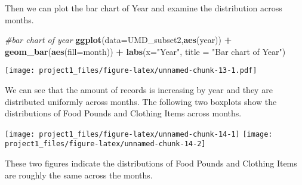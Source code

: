 \documentclass[]{article}
\newenvironment{Shaded}{\begin{snugshade}}{\end{snugshade}}
\newcommand{\CommentTok}[1]{\textcolor[rgb]{0.56,0.35,0.01}{\textit{#1}}}
\newcommand{\DataTypeTok}[1]{\textcolor[rgb]{0.13,0.29,0.53}{#1}}
\newcommand{\DecValTok}[1]{\textcolor[rgb]{0.00,0.00,0.81}{#1}}
\newcommand{\KeywordTok}[1]{\textcolor[rgb]{0.13,0.29,0.53}{\textbf{#1}}}
\newcommand{\NormalTok}[1]{#1}
\newcommand{\OperatorTok}[1]{\textcolor[rgb]{0.81,0.36,0.00}{\textbf{#1}}}
\newcommand{\StringTok}[1]{\textcolor[rgb]{0.31,0.60,0.02}{#1}}
\begin{document}
\begin{Shaded}
\end{Shaded}

Then we can plot the bar chart of Year and examine the distribution
across months.

\begin{Shaded}
\begin{Highlighting}[]
\CommentTok{#bar chart of year}
\KeywordTok{ggplot}\NormalTok{(}\DataTypeTok{data=}\NormalTok{UMD_subset2,}\KeywordTok{aes}\NormalTok{(year)) }\OperatorTok{+}
\StringTok{  }\KeywordTok{geom_bar}\NormalTok{(}\KeywordTok{aes}\NormalTok{(}\DataTypeTok{fill=}\NormalTok{month)) }\OperatorTok{+}
\StringTok{  }\KeywordTok{labs}\NormalTok{(}\DataTypeTok{x=}\StringTok{"Year"}\NormalTok{,}
       \DataTypeTok{title =} \StringTok{"Bar chart of Year"}\NormalTok{)}
\end{Highlighting}
\end{Shaded}

\texttt{[image: project1\_files/figure-latex/unnamed-chunk-13-1.pdf]}

We can see that the amount of records is increasing by year and they are
distributed uniformly across months. The following two boxplots show the
distributions of Food Pounds and Clothing Items across months.

\texttt{[image: project1\_files/figure-latex/unnamed-chunk-14-1]}
\texttt{[image: project1\_files/figure-latex/unnamed-chunk-14-2]}

These two figures indicate the distributions of Food Pounds and Clothing
Items are roughly the same across the months.
\end{document}

